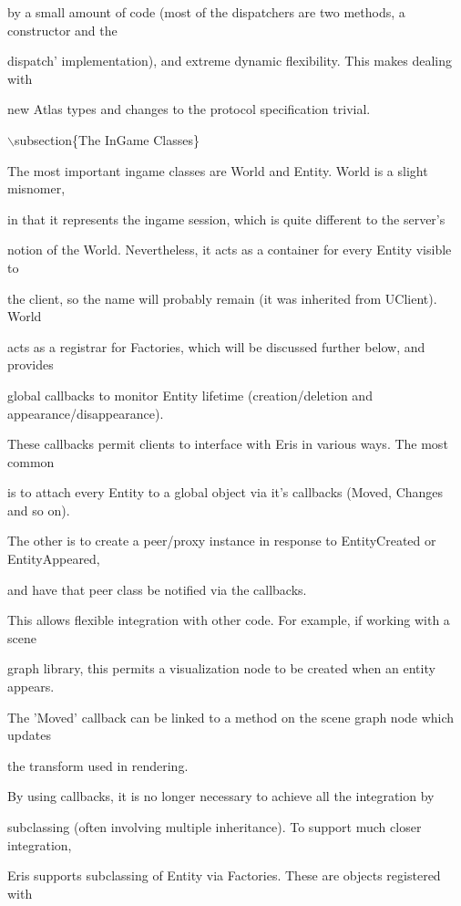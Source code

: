 \documentclass[12pt]{article}
\begin{document}
by a small amount of code (most of the dispatchers are two methods, a constructor and the

dispatch' implementation), and extreme dynamic flexibility. This makes dealing with

new Atlas types and changes to the protocol specification trivial.



\ensuremath{\backslash}subsection\{The InGame Classes\}



The most important ingame classes are World and Entity. World is a slight misnomer,

in that it represents the ingame session, which is quite different to the server's

notion of the World. Nevertheless, it acts as a container for every Entity visible to

the client, so the name will probably remain (it was inherited from UClient). World

acts as a registrar for Factories, which will be discussed further below, and provides

global callbacks to monitor Entity lifetime (creation/deletion and appearance/disappearance).

These callbacks permit clients to interface with Eris in various ways. The most common

is to attach every Entity to a global object via it's callbacks (Moved, Changes and so on).

The other is to create a peer/proxy instance in response to EntityCreated or EntityAppeared,

and have that peer class be notified via the callbacks.



This allows flexible integration with other code. For example, if working with a scene

graph library, this permits a visualization node to be created when an entity appears.

The 'Moved' callback can be linked to a method on the scene graph node which updates

the transform used in rendering.



By using callbacks, it is no longer necessary to achieve all the integration by

subclassing (often involving multiple inheritance). To support much closer integration,

Eris supports subclassing of Entity via Factories. These are objects registered with
\end{document}
